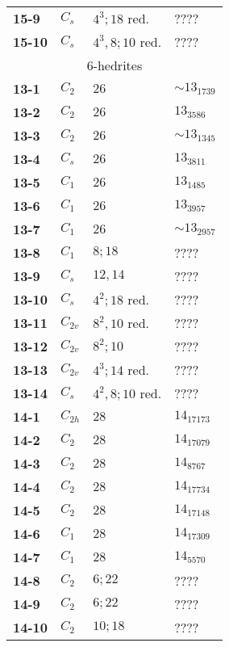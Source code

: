 \documentclass[12pt]{article}
\begin{document}
\begin{table}
\begin{center}
{\begin{minipage}{7cm}
\begin{tabular}{||l|l|l|l||}
{\bf 15-9}      &$C_s$  &$4^3; 18$ red. &????\\
{\bf 15-10}     &$C_s$  &$4^3, 8; 10$ red.      &????\\\hline\hline
\multicolumn{4}{||c||}{$6$-hedrites}\\\hline
{\bf 13-1}      &$C_2$  &$26$           &$\sim 13_{1739}$\\
{\bf 13-2}      &$C_2$  &$26$           &$13_{3586}$\\
{\bf 13-3}      &$C_2$  &$26$           &$\sim 13_{1345}$\\
{\bf 13-4}      &$C_s$  &$26$           &$13_{3811}$\\
{\bf 13-5}      &$C_1$  &$26$           &$13_{1485}$\\
{\bf 13-6}      &$C_1$  &$26$           &$13_{3957}$\\
{\bf 13-7}      &$C_1$  &$26$           &$\sim 13_{2957}$\\
{\bf 13-8}      &$C_1$  &$8; 18$                &????\\
{\bf 13-9}      &$C_s$  &$12, 14$               &????\\
{\bf 13-10}     &$C_s$  &$4^2; 18$ red. &????\\
{\bf 13-11}     &$C_{2v}$       &$8^2, 10$ red. &????\\
{\bf 13-12}     &$C_{2v}$       &$8^2; 10$      &????\\
{\bf 13-13}     &$C_{2v}$       &$4^3; 14$ red. &????\\
{\bf 13-14}     &$C_s$  &$4^2,8;10$ red.        &????\\\hline
{\bf 14-1}      &$C_{2h}$       &$28$           &$14_{17173}$\\
{\bf 14-2}      &$C_{2}$        &$28$           &$14_{17079}$\\
{\bf 14-3}      &$C_2$  &$28$           &$14_{8767}$\\
{\bf 14-4}      &$C_2$  &$28$           &$14_{17734}$\\
{\bf 14-5}      &$C_2$  &$28$           &$14_{17148}$\\
{\bf 14-6}      &$C_1$  &$28$           &$14_{17309}$\\
{\bf 14-7}      &$C_1$  &$28$           &$14_{5570}$\\
{\bf 14-8}      &$C_{2}$        &$6; 22$                &????\\
{\bf 14-9}      &$C_2$  &$6; 22$                &????\\
{\bf 14-10}     &$C_2$  &$10; 18$               &????\\

\end{tabular}
\end{minipage}}
\end{center}
\end{table}
\end{document}
